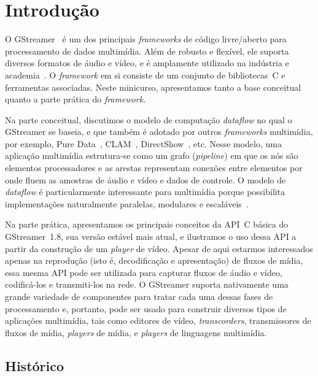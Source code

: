 \documentclass{SBCbookchapter}
\begin{document}

\section{Introdução}
\label{sc:intro}

O GStreamer~\cite{gstreamer} é um dos principais \emph{frameworks} de código
livre/aberto para processamento de dados multimídia.  Além de robusto e
flexível, ele suporta diversos formatos de áudio e vídeo, e é amplamente
utilizado na indústria e academia~\cite{gstreamer-apps}.  O \emph{framework}
em si consiste de um conjunto de bibliotecas~C e ferramentas associadas.
Neste minicurso, apresentamos tanto a base conceitual quanto a parte prática
do \emph{framework}.

Na parte conceitual, discutimos o modelo de computação \emph{dataflow} no
qual o GStreamer se baseia, e que também é adotado por outros
\emph{frameworks} multimídia, por exemplo, Pure
Data~\cite{Puckette-M-S-2007}, CLAM~\cite{Amatriain-X-2008},
DirectShow~\cite{Chatterjee-A-1997}, etc.  Nesse modelo, uma aplicação
multimídia estrutura-se como um grafo (\emph{pipeline}) em que os nós são
elementos processadores e as arestas representam conexões entre elementos
por onde fluem as amostras de áudio e vídeo e dados de controle.  O modelo
de \emph{dataflow} é particularmente interessante para multimídia porque
possibilita implementações naturalmente paralelas, modulares e
escaláveis~\cite{Yviquel-H-2014}.

Na parte prática, apresentamos os principais conceitos da API~C básica do
GStreamer~1.8, sua versão estável mais atual, e ilustramos o uso dessa API a
partir da construção de um \emph{player} de vídeo.  Apesar de aqui estarmos
interessados apenas na reprodução (isto é, decodificação e apresentação) de
fluxos de mídia, essa mesma API pode ser utilizada para capturar fluxos de
áudio e vídeo, codificá-los e transmiti-los na rede.  O GStreamer suporta
nativamente uma grande variedade de componentes para tratar cada uma dessas
fases de processamento e, portanto, pode ser usado para construir diversos
tipos de aplicações multimídia, tais como editores de vídeo,
\emph{transcorders}, transmissores de fluxos de mídia, \emph{players} de
mídia, e \emph{players} de linguagens multimídia.



\subsection*{Histórico}
\end{document}
